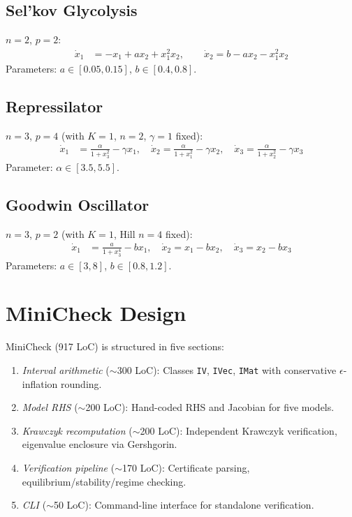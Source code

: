 \documentclass[11pt]{article}
\begin{document}
\subsection{Sel'kov Glycolysis}

$n=2$, $p=2$:
\begin{align*}
\dot{x}_1 &= -x_1 + ax_2 + x_1^2 x_2, \qquad
\dot{x}_2 = b - ax_2 - x_1^2 x_2
\end{align*}
Parameters: $a \in [0.05, 0.15]$, $b \in [0.4, 0.8]$.

\subsection{Repressilator~\cite{elowitz2000repressilator}}

$n=3$, $p=4$ (with $K{=}1$, $n{=}2$, $\gamma{=}1$ fixed):
\begin{align*}
\dot{x}_1 &= \frac{\alpha}{1 + x_3^2} - \gamma x_1, \quad
\dot{x}_2 = \frac{\alpha}{1 + x_1^2} - \gamma x_2, \quad
\dot{x}_3 = \frac{\alpha}{1 + x_2^2} - \gamma x_3
\end{align*}
Parameter: $\alpha \in [3.5, 5.5]$.

\subsection{Goodwin Oscillator~\cite{goodwin1965oscillatory}}

$n=3$, $p=2$ (with $K{=}1$, Hill $n{=}4$ fixed):
\begin{align*}
\dot{x}_1 &= \frac{a}{1 + x_3^4} - bx_1, \quad
\dot{x}_2 = x_1 - bx_2, \quad
\dot{x}_3 = x_2 - bx_3
\end{align*}
Parameters: $a \in [3, 8]$, $b \in [0.8, 1.2]$.

\section{MiniCheck Design}
\label{app:minicheck}

MiniCheck (917 LoC) is structured in five sections:
\begin{enumerate}
\item \emph{Interval arithmetic} ($\sim$300 LoC): Classes \texttt{IV}, \texttt{IVec}, \texttt{IMat} with conservative $\epsilon$-inflation rounding.
\item \emph{Model RHS} ($\sim$200 LoC): Hand-coded RHS and Jacobian for five models.
\item \emph{Krawczyk recomputation} ($\sim$200 LoC): Independent Krawczyk verification, eigenvalue enclosure via Gershgorin.
\item \emph{Verification pipeline} ($\sim$170 LoC): Certificate parsing, equilibrium/stability/regime checking.
\item \emph{CLI} ($\sim$50 LoC): Command-line interface for standalone verification.
\end{enumerate}
\end{document}
